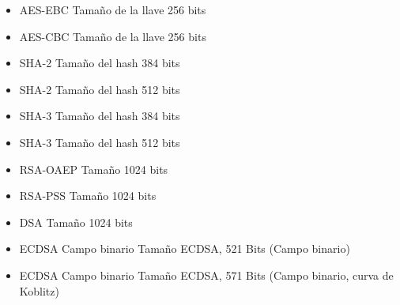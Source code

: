 \documentclass[../main.tex]{subfiles}
\begin{document}
\begin{itemize}
  \item AES-EBC
        Tamaño de la llave 256 bits

  \item AES-CBC
        Tamaño de la llave 256 bits

  \item SHA-2
        Tamaño del hash 384 bits

  \item SHA-2
        Tamaño del hash 512 bits

  \item SHA-3
        Tamaño del hash 384 bits

  \item SHA-3
        Tamaño del hash 512 bits

  \item RSA-OAEP
        Tamaño 1024 bits

  \item RSA-PSS
        Tamaño 1024 bits

  \item DSA
        Tamaño 1024 bits

  \item ECDSA Campo binario
        Tamaño ECDSA, 521 Bits (Campo binario)

  \item ECDSA Campo binario
        Tamaño ECDSA, 571 Bits (Campo binario, curva de Koblitz)
\end{itemize}
\end{document}
